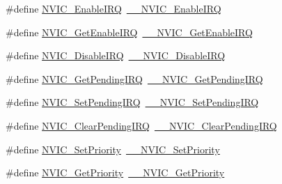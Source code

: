 \begin{DoxyCompactItemize}
\item 
\#define \hyperlink{group___c_m_s_i_s___core___n_v_i_c_functions_ga57b3064413dbc7459d9646020fdd8bef}{N\+V\+I\+C\+\_\+\+Enable\+I\+RQ}~\hyperlink{group___c_m_s_i_s___core___n_v_i_c_functions_ga71227e1376cde11eda03fcb62f1b33ea}{\+\_\+\+\_\+\+N\+V\+I\+C\+\_\+\+Enable\+I\+RQ}
\item 
\#define \hyperlink{group___c_m_s_i_s___core___n_v_i_c_functions_ga857de13232ec65dd15087eaa15bc4a69}{N\+V\+I\+C\+\_\+\+Get\+Enable\+I\+RQ}~\hyperlink{group___c_m_s_i_s___core___n_v_i_c_functions_gaaeb5e7cc0eaad4e2817272e7bf742083}{\+\_\+\+\_\+\+N\+V\+I\+C\+\_\+\+Get\+Enable\+I\+RQ}
\item 
\#define \hyperlink{group___c_m_s_i_s___core___n_v_i_c_functions_ga73b4e251f59cab4e9a5e234aac02ae57}{N\+V\+I\+C\+\_\+\+Disable\+I\+RQ}~\hyperlink{group___c_m_s_i_s___core___n_v_i_c_functions_gae016e4c1986312044ee768806537d52f}{\+\_\+\+\_\+\+N\+V\+I\+C\+\_\+\+Disable\+I\+RQ}
\item 
\#define \hyperlink{group___c_m_s_i_s___core___n_v_i_c_functions_gac608957a239466e9e0cbc30aa64feb3b}{N\+V\+I\+C\+\_\+\+Get\+Pending\+I\+RQ}~\hyperlink{group___c_m_s_i_s___core___n_v_i_c_functions_ga5a92ca5fa801ad7adb92be7257ab9694}{\+\_\+\+\_\+\+N\+V\+I\+C\+\_\+\+Get\+Pending\+I\+RQ}
\item 
\#define \hyperlink{group___c_m_s_i_s___core___n_v_i_c_functions_ga2b47e2e52cf5c48a5c3348636434b3ac}{N\+V\+I\+C\+\_\+\+Set\+Pending\+I\+RQ}~\hyperlink{group___c_m_s_i_s___core___n_v_i_c_functions_gaabefdd4b790b9a7308929938c0c1e1ad}{\+\_\+\+\_\+\+N\+V\+I\+C\+\_\+\+Set\+Pending\+I\+RQ}
\item 
\#define \hyperlink{group___c_m_s_i_s___core___n_v_i_c_functions_ga590cf113000a079b1f0ea3dcd5b5316c}{N\+V\+I\+C\+\_\+\+Clear\+Pending\+I\+RQ}~\hyperlink{group___c_m_s_i_s___core___n_v_i_c_functions_ga562a86dbdf14827d0fee8fdafb04d191}{\+\_\+\+\_\+\+N\+V\+I\+C\+\_\+\+Clear\+Pending\+I\+RQ}
\item 
\#define \hyperlink{group___c_m_s_i_s___core___n_v_i_c_functions_gae0e9d0e2f7b6133828c71b57d4941c35}{N\+V\+I\+C\+\_\+\+Set\+Priority}~\hyperlink{group___c_m_s_i_s___core___n_v_i_c_functions_ga505338e23563a9c074910fb14e7d45fd}{\+\_\+\+\_\+\+N\+V\+I\+C\+\_\+\+Set\+Priority}
\item 
\#define \hyperlink{group___c_m_s_i_s___core___n_v_i_c_functions_gaf59b9d0a791d2157abb319753953eceb}{N\+V\+I\+C\+\_\+\+Get\+Priority}~\hyperlink{group___c_m_s_i_s___core___n_v_i_c_functions_gaeb9dc99c8e7700668813144261b0bc73}{\+\_\+\+\_\+\+N\+V\+I\+C\+\_\+\+Get\+Priority}

\end{DoxyCompactItemize}

